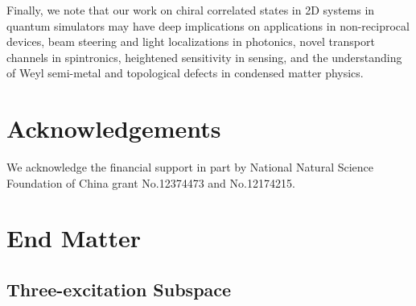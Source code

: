\documentclass[longbibliography, aps, prx, amsmath, amssymb, amsfonts, twocolumn,superscriptaddress, footinbib]{revtex4-1}
\begin{document}
    Finally, we note that our work on chiral correlated states in 2D systems in quantum simulators may have deep implications on applications in non-reciprocal devices, beam steering and light localizations in photonics, novel transport channels in spintronics, heightened sensitivity in sensing, and the understanding of Weyl semi-metal and topological defects in condensed matter physics.

    \section*{Acknowledgements}
	We acknowledge the financial support in part by National Natural Science Foundation of China grant No.12374473 and No.12174215.

	
	

\clearpage

	\section*{End Matter~\label{sec:method}}
	\subsection{Three-excitation Subspace~\label{sec:three_excitation}}
\end{document}

